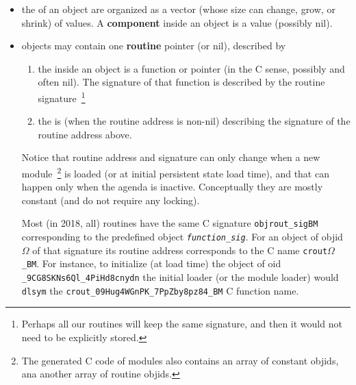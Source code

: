 \begin{itemize}
    \item the  of an object are
      organized as a vector (whose size can change, grow, or shrink)
      of values. A \textbf{component} inside an object is a value
      (possibly nil).

      \item objects may contain one \textbf{routine} pointer (or nil),
        described by \begin{enumerate}
          
        \item the 
          inside an object is a function or 
          pointer (in the C sense, possibly and often nil). The
          signature of that function is described by the routine
          signature~\footnote{Perhaps all our routines will keep the
            same signature, and then it would not need to be
            explicitly stored.}

        \item the 
          is (when the routine address is non-nil) describing the
          signature of the routine address above.
      \end{enumerate}

      Notice that routine address and signature can only change when
      a new module~\footnote{The generated C code of modules also
        contains an array of constant objids, ana another array of
        routine objids.} is loaded (or at initial persistent state load
      time), and that can happen only when the agenda is
      inactive. Conceptually they are mostly constant (and do not
      require any locking).
        
      Most (in 2018, all) routines have the same C signature
      \texttt{objrout\_sigBM} corresponding to the predefined object
      \texttt{\emph{function\_sig}}. For an object of objid
      {$\Omega$} of that signature its routine address
      corresponds to the C name \texttt{crout}{$\Omega$}\texttt{\_BM}. For
      instance, to initialize (at load time) the object of oid
      \texttt{\_9CG8SKNs6Ql\_4PiHd8cnydn} the initial loader (or the
      module loader) would \texttt{dlsym} the
      \texttt{crout\_09Hug4WGnPK\_7PpZby8pz84\_BM} C function name.



\end{itemize}
